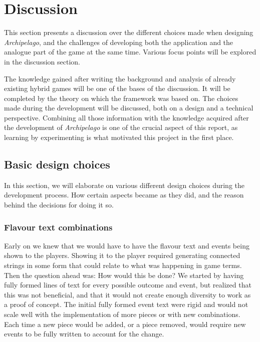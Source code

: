 \chapter{Discussion}
\label{sec:disc}
This section presents a discussion over the different choices made when designing \textit{Archipelago}, and the challenges of developing both the application and the analogue part of the game at the same time. Various focus points will be explored in the discussion section. 

The knowledge gained after writing the background and analysis of already existing hybrid games will be one of the bases of the discussion. It will be completed by the theory on which the framework was based on. The choices made during the development will be discussed, both on a design and a technical perspective. Combining all those information with the knowledge acquired after the development of \textit{Archipelago} is one of the crucial aspect of this report, as learning by experimenting is what motivated this project in the first place.

\section{Basic design choices} 
In this section, we will elaborate on various different design choices during the development process. How certain aspects became as they did, and the reason behind the decisions for doing it so.

\subsection{Flavour text combinations}
Early on we knew that we would have to have the flavour text and events being shown to the players. Showing it to the player required generating connected strings in some form that could relate to what was happening in game terms.
Then the question ahead was: How would this be done?
We started by having fully formed lines of text for every possible outcome and event, but realized that this was not beneficial, and that it would not create enough diversity to work as a proof of concept. 
The initial fully formed event text were rigid and would not scale well with the implementation of more pieces or with new combinations. Each time a new piece would be added, or a piece removed, would require new events to be fully written to account for the change. 

